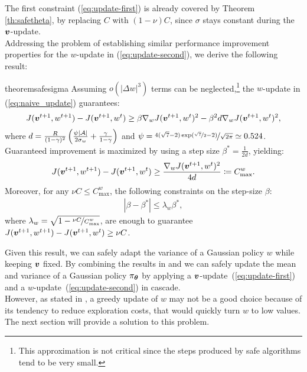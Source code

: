 The first constraint (\ref{eq:update-first}) is already covered by Theorem \ref{th:safetheta}, by replacing $C$ with $(1-\nu)C$, since $\sigma$ stays constant during the $\vv$-update. \\
Addressing the problem of establishing similar performance improvement properties for the $w$-update in (\ref{eq:update-second}), we derive the following result:
\begin{restatable}[]{theorem}{safesigma}\label{th:safesigma}
	Assuming $o(|\Delta w|^3)$ terms can be neglected,\footnote{This approximation is not critical since the steps produced by safe algorithms tend to be very small.} the $w$-update in (\ref{eq:naive_update}) guarantees:
	\begin{align}\label{stat:2_1}
	J(\vv^{t+1}, w^{t+1}) - J(\vv^{t+1}, w^t) \geq \beta\gradJ[w]{\vv^{t+1}, w^t}^2 - \beta^2 d\gradJ[w]{\vv^{t+1}, w^t}^2,
	\end{align}
	where $d=\frac{R}{(1-\gamma)^2}\left(\frac{\psi|\Aspace|}{2\sigma_{w}}+\frac{\gamma}{1-\gamma}\right)$ and $\psi = \nicefrac{4(\sqrt{7} - 2)\exp(\nicefrac{\sqrt{7}}{2} - 2)}{\sqrt{2\pi}} \simeq 0.524$. Guaranteed improvement is maximized by using a step size $\beta^*=\frac{1}{2d}$, yielding:
	\begin{align}\label{stat:2_2}
	J(\vv^{t+1},w^{t+1}) - J(\vv^{t+1}, w^t) \geq \frac{\gradJ[w]{\vv^{t+1}, w^t}^2}{4d}
	\coloneqq C_{\text{max}}^w. 
	\end{align}
	Moreover, for any $\nu C\leq C_{\text{max}}^{w}$, the following constraints on the step-size $\beta$:
	\begin{align}\label{stat:2_3}
	|\beta - \beta^*| \leq \lambda_{w}\beta^*, 
	\end{align}
	where $\lambda_{w}=\sqrt{1 - \nicefrac{\nu C}{C_{\text{max}}^{w}}}$, are enough to guarantee $J(\vv^{t+1},w^{t+1}) - J(\vv^{t+1},w^t)\geq \nu C$.
\end{restatable}

Given this result, we can safely adapt the variance of a Gaussian policy $w$ while keeping $\vv$ fixed. By combining the results in  and  we can safely update the mean and variance of a Gaussian policy $\pi_{\vtheta}$ by applying a $\vv$-update~(\ref{eq:update-first}) and a $w$-update~(\ref{eq:update-second}) in cascade.\\
However, as stated in , a greedy update of $w$ may not be a good choice because of its tendency to reduce exploration costs, that would quickly turn $w$ to low values. The next section will provide a solution to this problem.

